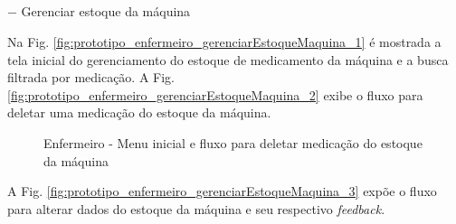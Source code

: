 \subparagraph*{} $-$ Gerenciar estoque da máquina

Na Fig. \ref{fig:prototipo_enfermeiro_gerenciarEstoqueMaquina_1} é mostrada a tela inicial do gerenciamento do estoque de medicamento da máquina e a busca filtrada por medicação. A Fig. \ref{fig:prototipo_enfermeiro_gerenciarEstoqueMaquina_2} exibe o fluxo para deletar uma medicação do estoque da máquina.

\begin{figure}[H]
    \centering
    \caption{Enfermeiro - Menu inicial e fluxo para deletar medicação do estoque da máquina}
\end{figure}

A Fig. \ref{fig:prototipo_enfermeiro_gerenciarEstoqueMaquina_3} expõe o fluxo para alterar dados do estoque da máquina e seu respectivo \textit{feedback}.

